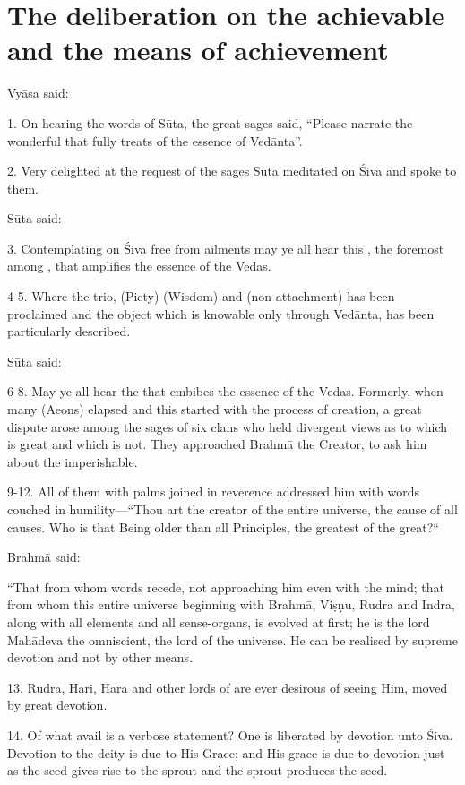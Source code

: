 \chapter{The deliberation on the achievable and the means of achievement}

Vyāsa said:

1. On hearing the words of Sūta, the great sages said, “Please narrate
the wonderful  that fully treats of the essence of Vedānta”.

2. Very delighted at the request of the sages Sūta meditated on Śiva and spoke
to them.

Sūta said:

3. Contemplating on Śiva free from ailments may ye all hear this ,
the foremost among , that amplifies the essence of the Vedas.

4-5. Where the trio,  (Piety)  (Wisdom) and 
(non-attachment) has been proclaimed and the object which is knowable only
through Vedānta, has been particularly described.

Sūta said:

6-8. May ye all hear the  that embibes the essence of the Vedas.
Formerly, when many  (Aeons) elapsed and this  started with
the process of creation, a great dispute arose among the sages of six clans who
held divergent views as to which is great and which is not. They approached
Brahmā the Creator, to ask him about the imperishable.

9-12. All of them with palms joined in reverence addressed him with words
couched in humility—“Thou art the creator of the entire universe, the cause of
all causes. Who is that Being older than all Principles, the greatest of
the great?“

Brahmā said:

“That from whom words recede, not approaching him even with the mind; that from
whom this entire universe beginning with Brahmā, Viṣṇu, Rudra and Indra, along
with all elements and all sense-organs, is evolved at first; he is the lord
Mahādeva the omniscient, the lord of the universe. He can be realised by supreme
devotion and not by other means.

13. Rudra, Hari, Hara and other lords of  are ever desirous of seeing
Him, moved by great devotion.

14. Of what avail is a verbose statement? One is liberated by devotion unto Śiva.
Devotion to the deity is due to His Grace; and His grace is due to devotion just
as the seed gives rise to the sprout and the sprout produces the seed.

